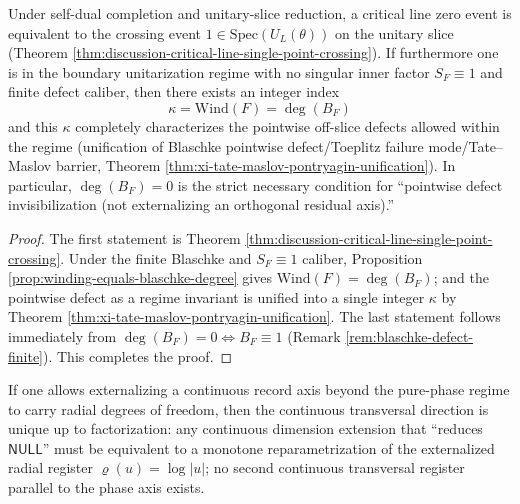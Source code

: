 \begin{theorem}\label{thm:discussion-crossing-winding-blaschke-index}
Under self-dual completion and unitary-slice reduction, a critical line zero event is equivalent to the crossing event \(1\in\mathrm{Spec}(U_L(\theta))\) on the unitary slice (Theorem \ref{thm:discussion-critical-line-single-point-crossing}).
If furthermore one is in the boundary unitarization regime with no singular inner factor \(S_F\equiv 1\) and finite defect caliber, then there exists an integer index
\[
\boxed{\ \kappa=\mathrm{Wind}(F)=\deg(B_F)\ }
\]
and this \(\kappa\) completely characterizes the pointwise off-slice defects allowed within the regime (unification of Blaschke pointwise defect/Toeplitz failure mode/Tate--Maslov barrier, Theorem \ref{thm:xi-tate-maslov-pontryagin-unification}).
In particular, \(\deg(B_F)=0\) is the strict necessary condition for ``pointwise defect invisibilization (not externalizing an orthogonal residual axis).''
\end{theorem}

\begin{proof}
The first statement is Theorem \ref{thm:discussion-critical-line-single-point-crossing}.
Under the finite Blaschke and \(S_F\equiv 1\) caliber, Proposition \ref{prop:winding-equals-blaschke-degree} gives \(\mathrm{Wind}(F)=\deg(B_F)\);
and the pointwise defect as a regime invariant is unified into a single integer \(\kappa\) by Theorem \ref{thm:xi-tate-maslov-pontryagin-unification}.
The last statement follows immediately from \(\deg(B_F)=0\iff B_F\equiv 1\) (Remark \ref{rem:blaschke-defect-finite}). This completes the proof.
\end{proof}

\begin{theorem}\label{thm:discussion-unique-continuous-transversal}
If one allows externalizing a continuous record axis beyond the pure-phase regime to carry radial degrees of freedom, then the continuous transversal direction is unique up to factorization: any continuous dimension extension that ``reduces \(\mathsf{NULL}\)'' must be equivalent to a monotone reparametrization of the externalized radial register \(\varrho(u)=\log|u|\); no second continuous transversal register parallel to the phase axis exists.
\end{theorem}

